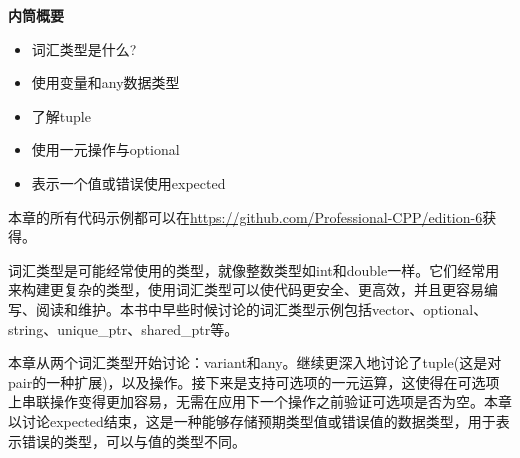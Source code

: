 \noindent
\textbf{内筒概要}

\begin{itemize}
\item
词汇类型是什么?

\item
使用变量和any数据类型

\item
了解tuple

\item
使用一元操作与optional

\item
表示一个值或错误使用expected
\end{itemize}

本章的所有代码示例都可以在\url{https://github.com/Professional-CPP/edition-6}获得。

词汇类型是可能经常使用的类型，就像整数类型如int和double一样。它们经常用来构建更复杂的类型，使用词汇类型可以使代码更安全、更高效，并且更容易编写、阅读和维护。本书中早些时候讨论的词汇类型示例包括vector、optional、string、unique\_ptr、shared\_ptr等。

本章从两个词汇类型开始讨论：variant和any。继续更深入地讨论了tuple(这是对pair的一种扩展)，以及操作。接下来是支持可选项的一元运算，这使得在可选项上串联操作变得更加容易，无需在应用下一个操作之前验证可选项是否为空。本章以讨论expected结束，这是一种能够存储预期类型值或错误值的数据类型，用于表示错误的类型，可以与值的类型不同。
